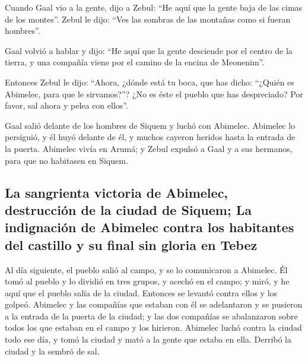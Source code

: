 \begin{paracol}{2}
 Cuando Gaal vio a la gente, dijo a Zebul: ``He aquí que
la gente baja de las cimas de los montes''. Zebul le dijo: ``Ves las
sombras de las montañas como si fueran hombres''.

 Gaal volvió a hablar y dijo: ``He aquí que la gente
desciende por el centro de la tierra, y una compañía viene por el camino
de la encina de Meonenim''.

 Entonces Zebul le dijo: ``Ahora, ¿dónde está tu boca,
que has dicho: ``¿Quién es Abimelec, para que le sirvamos?''? ¿No es
éste el pueblo que has despreciado? Por favor, sal ahora y pelea con
ellos''.

 Gaal salió delante de los hombres de Siquem y luchó con
Abimelec.  Abimelec lo persiguió, y él huyó delante de
él, y muchos cayeron heridos hasta la entrada de la puerta.
 Abimelec vivía en Arumá; y Zebul expulsó a Gaal y a sus
hermanos, para que no habitasen en Siquem.

\hypertarget{la-sangrienta-victoria-de-abimelec-destrucciuxf3n-de-la-ciudad-de-siquem-la-indignaciuxf3n-de-abimelec-contra-los-habitantes-del-castillo-y-su-final-sin-gloria-en-tebez}{%
\subsection{La sangrienta victoria de Abimelec, destrucción de la ciudad
de Siquem; La indignación de Abimelec contra los habitantes del castillo
y su final sin gloria en
Tebez}\label{la-sangrienta-victoria-de-abimelec-destrucciuxf3n-de-la-ciudad-de-siquem-la-indignaciuxf3n-de-abimelec-contra-los-habitantes-del-castillo-y-su-final-sin-gloria-en-tebez}}

 Al día siguiente, el pueblo salió al campo, y se lo
comunicaron a Abimelec.  Él tomó al pueblo y lo dividió
en tres grupos, y acechó en el campo; y miró, y he aquí que el pueblo
salía de la ciudad. Entonces se levantó contra ellos y los golpeó.
 Abimelec y las compañías que estaban con él se
adelantaron y se pusieron a la entrada de la puerta de la ciudad; y las
dos compañías se abalanzaron sobre todos los que estaban en el campo y
los hirieron.  Abimelec luchó contra la ciudad todo ese
día, y tomó la ciudad y mató a la gente que estaba en ella. Derribó la
ciudad y la sembró de sal.


\end{paracol}
